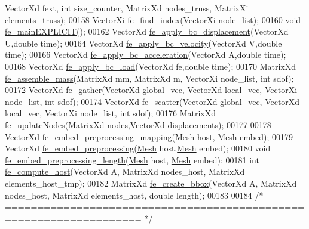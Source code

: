 \begin{DoxyCode}
      VectorXd fext, \textcolor{keywordtype}{int} size\_counter, MatrixXd nodes\_truss, MatrixXi elements\_truss);
00158 VectorXi \hyperlink{functions_8h_ae4dbe24b761cafa3577afab76726b382}{fe\_find\_index}(VectorXi node\_list);
00160 \textcolor{keywordtype}{void} \hyperlink{functions_8h_ab2f8704631ca6c23a453d1905efbb162}{fe\_mainEXPLICIT}();
00162 VectorXd \hyperlink{functions_8h_af42938e5b32edb33ef4a35866949eba6}{fe\_apply\_bc\_displacement}(VectorXd U,\textcolor{keywordtype}{double} time);
00164 VectorXd \hyperlink{functions_8h_a4627586ca0e6b9e3904cdbc7bb561e9e}{fe\_apply\_bc\_velocity}(VectorXd V,\textcolor{keywordtype}{double} time);
00166 VectorXd \hyperlink{functions_8h_ac0ffd5f19ac286c91d431a4ec72dbab4}{fe\_apply\_bc\_acceleration}(VectorXd A,\textcolor{keywordtype}{double} time);
00168 VectorXd \hyperlink{functions_8h_aba32cc24bd74a4965c560fa62c5b213e}{fe\_apply\_bc\_load}(VectorXd fe,\textcolor{keywordtype}{double} time);
00170 MatrixXd \hyperlink{functions_8h_a04f569c566ca4fbea3b3a2a13cdd0af5}{fe\_assemble\_mass}(MatrixXd mm, MatrixXd m, VectorXi node\_list, \textcolor{keywordtype}{int} sdof);
00172 VectorXd \hyperlink{functions_8h_ab5053cb12ac67971a7836346e2839725}{fe\_gather}(VectorXd global\_vec, VectorXd local\_vec, VectorXi node\_list, \textcolor{keywordtype}{int} sdof);
00174 VectorXd \hyperlink{functions_8h_a6b8344e12f9005795f93f60ddda26c5c}{fe\_scatter}(VectorXd global\_vec, VectorXd local\_vec, VectorXi node\_list, \textcolor{keywordtype}{int} sdof);
00176 MatrixXd \hyperlink{functions_8h_a81ce693c4400df82b8753f25cc2dcabc}{fe\_updateNodes}(MatrixXd nodes,VectorXd displacements);
00177 
00178 VectorXd \hyperlink{functions_8h_a0600721e5cf84d84408ce9605b004610}{fe\_embed\_preprocessing\_mapping}(\hyperlink{class_mesh}{Mesh} host, 
      \hyperlink{class_mesh}{Mesh} embed);
00179 VectorXd \hyperlink{functions_8h_a840ddc7df1916f6b5dfbb141adac32d3}{fe\_embed\_preprocessing}(\hyperlink{class_mesh}{Mesh} host,\hyperlink{class_mesh}{Mesh} embed);
00180 \textcolor{keywordtype}{void} \hyperlink{functions_8h_a50e8d7839525058d40e3a53f9d5de77c}{fe\_embed\_preprocessing\_length}(\hyperlink{class_mesh}{Mesh} host, 
      \hyperlink{class_mesh}{Mesh} embed);
00181 \textcolor{keywordtype}{int} \hyperlink{functions_8h_a453ba6bc1e7d5a63db9d56beb6077a27}{fe\_compute\_host}(VectorXd A, MatrixXd nodes\_host, MatrixXd elements\_host\_tmp);
00182 MatrixXd \hyperlink{functions_8h_a150d77644eb280d58564e3ff4885e73c}{fe\_create\_bbox}(VectorXd A, MatrixXd nodes\_host, MatrixXd elements\_host, \textcolor{keywordtype}{double} 
      length);
00183 
00184 \textcolor{comment}{/* =================================================================== */}

\end{DoxyCode}
